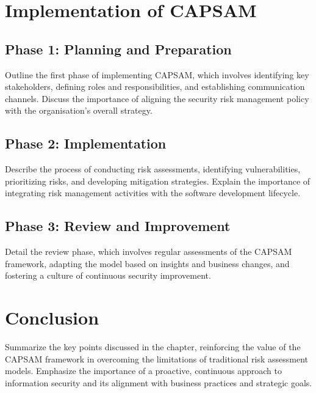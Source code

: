 \section{Implementation of CAPSAM}
    \subsection{Phase 1: Planning and Preparation}
    Outline the first phase of implementing CAPSAM, which involves identifying key stakeholders, defining roles and responsibilities, and establishing communication channels. Discuss the importance of aligning the security risk management policy with the organisation’s overall strategy.

    \subsection{Phase 2: Implementation}
    Describe the process of conducting risk assessments, identifying vulnerabilities, prioritizing risks, and developing mitigation strategies. Explain the importance of integrating risk management activities with the software development lifecycle.

    \subsection{Phase 3: Review and Improvement}
    Detail the review phase, which involves regular assessments of the CAPSAM framework, adapting the model based on insights and business changes, and fostering a culture of continuous security improvement.

\section{Conclusion}
Summarize the key points discussed in the chapter, reinforcing the value of the CAPSAM framework in overcoming the limitations of traditional risk assessment models. Emphasize the importance of a proactive, continuous approach to information security and its alignment with business practices and strategic goals.